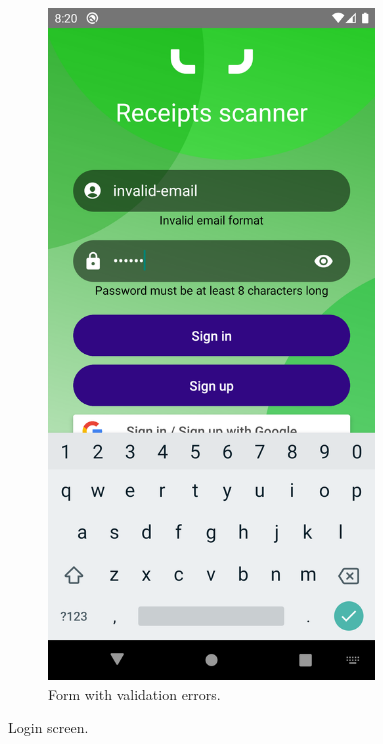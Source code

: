 \documentclass[
  digital, %
  table,   %
  oneside, %
  lof,     %
  lot,     %
]{fithesis3}
\begin{document}
\begin{figure}
\begin{subfigure}[t]{0.5\textwidth}
  \centering
  \includegraphics[width=0.95\textwidth]{figures/screens/android/light/login_validation}
  \caption{Form with validation errors.}
  \label{fig:login_validation}
\end{subfigure}
\caption{Login screen.}
\end{figure}
\end{document}
